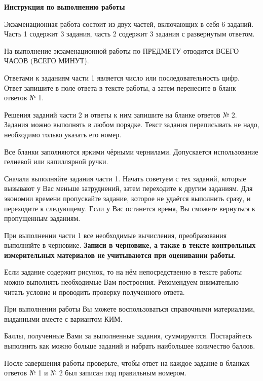 \documentclass{libre-oge}
\author{CSharpKun \& PositiveCHEEK}
\date{2026}
\begin{document}
\begin{center}
	\textbf{\large Инструкция по выполнению работы}
\end{center}


Экзаменационная работа состоит из двух частей, включающих в себя
6 заданий. Часть 1 содержит 3 задания, часть 2 содержит 3 задания с развернутым ответом.

На выполнение экзаменационной работы по ПРЕДМЕТУ отводится
ВСЕГО ЧАСОВ (ВСЕГО МИНУТ).


Ответами к заданиям части 1 является число или
последовательность цифр. Ответ запишите в поле ответа в тексте работы,
а затем перенесите в бланк ответов № 1.

Решения заданий части 2 и ответы к ним запишите на бланке
ответов № 2. Задания можно выполнять в любом порядке. Текст задания
переписывать не надо, необходимо только указать его номер.

Все бланки заполняются яркими чёрными чернилами. Допускается
использование гелиевой или капиллярной ручки.

Сначала выполняйте задания части 1. Начать советуем с тех заданий,
которые вызывают у Вас меньше затруднений, затем переходите к другим
заданиям. Для экономии времени пропускайте задание, которое не удаётся
выполнить сразу, и переходите к следующему. Если у Вас останется время,
Вы сможете вернуться к пропущенным заданиям.

При выполнении части 1 все необходимые вычисления,
преобразования выполняйте в черновике. \textbf{Записи в черновике, а также
в тексте контрольных измерительных материалов не учитываются при
оценивании работы.}


Если задание содержит рисунок, то на нём непосредственно в тексте
работы можно выполнять необходимые Вам построения. Рекомендуем
внимательно читать условие и проводить проверку полученного ответа.


При выполнении работы Вы можете воспользоваться справочными
материалами, выданными вместе с вариантом КИМ.

Баллы, полученные Вами за выполненные задания, суммируются.
Постарайтесь выполнить как можно больше заданий и набрать наибольшее
количество баллов.

После завершения работы проверьте, чтобы ответ на каждое задание
в бланках ответов № 1 и № 2 был записан под правильным номером.
\end{document}
